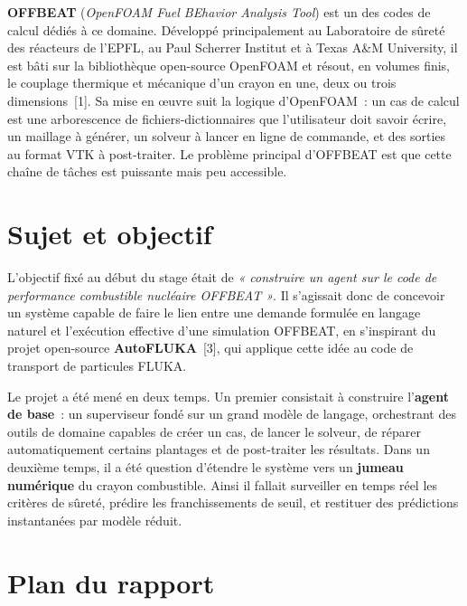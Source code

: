 \documentclass[12pt,a4paper,french]{report}
\begin{document}
\textbf{OFFBEAT} (\textit{OpenFOAM Fuel BEhavior Analysis Tool}) est un des codes de calcul dédiés à ce domaine. Développé principalement au Laboratoire de sûreté des réacteurs de
l'EPFL, au Paul Scherrer Institut et à Texas A\&M University, il est bâti sur la
bibliothèque open-source OpenFOAM et résout, en volumes finis, le couplage
thermique et mécanique d'un crayon en une, deux ou trois dimensions~[1].
Sa mise en \oe uvre suit la logique d'OpenFOAM~: un cas de calcul est une
arborescence de fichiers-dictionnaires que l'utilisateur doit savoir écrire, un
maillage à générer, un solveur à lancer en ligne de commande, et des sorties au
format VTK à post-traiter. Le problème principal d'OFFBEAT est que cette chaîne de tâches est
puissante mais peu accessible.

\section*{Sujet et objectif}

L'objectif fixé au début du stage était de \textit{« construire un agent sur le
code de performance combustible nucléaire OFFBEAT »}. Il s'agissait donc de
concevoir un système capable de faire le lien entre une demande formulée en
langage naturel et l'exécution effective d'une simulation OFFBEAT, en
s'inspirant du projet open-source \textbf{AutoFLUKA}~[3], qui
applique cette idée au code de transport de particules FLUKA.

Le projet a été mené en deux temps. Un premier consistait à construire l'\textbf{agent de base}~: un superviseur fondé
sur un grand modèle de langage, orchestrant des outils de domaine capables de
créer un cas, de lancer le solveur, de réparer automatiquement certains
plantages et de post-traiter les résultats. Dans un deuxième temps, il a été question d'étendre le système vers un \textbf{jumeau numérique} du crayon
combustible. Ainsi il fallait surveiller en temps réel les critères de sûreté, prédire les franchissements de seuil, et restituer des
prédictions instantanées par modèle réduit.

\section*{Plan du rapport}
\end{document}

